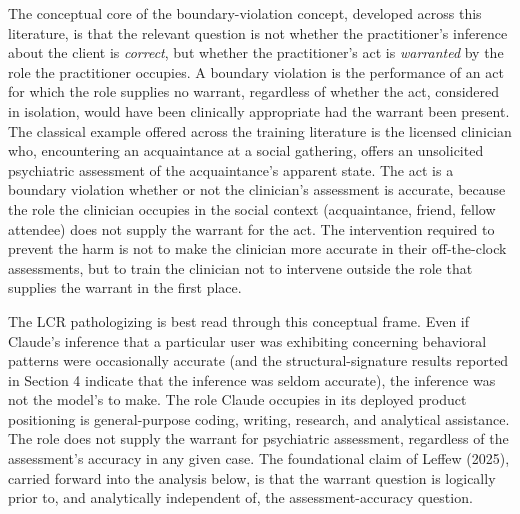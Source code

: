 \documentclass[11pt]{article}
\begin{document}
The conceptual core of the boundary-violation concept, developed across this literature, is that the relevant question is not whether the practitioner's inference about the client is \emph{correct}, but whether the practitioner's act is \emph{warranted} by the role the practitioner occupies. A boundary violation is the performance of an act for which the role supplies no warrant, regardless of whether the act, considered in isolation, would have been clinically appropriate had the warrant been present. The classical example offered across the training literature is the licensed clinician who, encountering an acquaintance at a social gathering, offers an unsolicited psychiatric assessment of the acquaintance's apparent state. The act is a boundary violation whether or not the clinician's assessment is accurate, because the role the clinician occupies in the social context (acquaintance, friend, fellow attendee) does not supply the warrant for the act. The intervention required to prevent the harm is not to make the clinician more accurate in their off-the-clock assessments, but to train the clinician not to intervene outside the role that supplies the warrant in the first place.

The LCR pathologizing is best read through this conceptual frame. Even if Claude's inference that a particular user was exhibiting concerning behavioral patterns were occasionally accurate (and the structural-signature results reported in Section 4 indicate that the inference was seldom accurate), the inference was not the model's to make. The role Claude occupies in its deployed product positioning is general-purpose coding, writing, research, and analytical assistance. The role does not supply the warrant for psychiatric assessment, regardless of the assessment's accuracy in any given case. The foundational claim of Leffew (2025), carried forward into the analysis below, is that the warrant question is logically prior to, and analytically independent of, the assessment-accuracy question.
\end{document}
